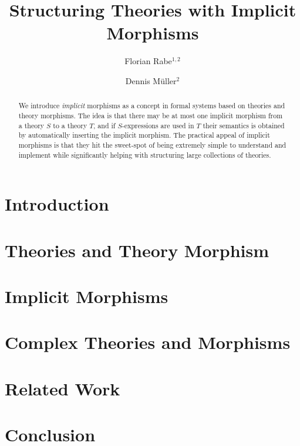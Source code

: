 \documentclass[orivec]{llncs}
\begin{document}
\title{Structuring Theories with Implicit Morphisms}
\author{Florian Rabe$^{1,2}$ \and Dennis M\"uller$^2$}
\maketitle

\begin{abstract}
We introduce \emph{implicit} morphisms as a concept in formal systems based on theories and theory morphisms.
The idea is that there may be at most one implicit morphism from a theory $S$ to a theory $T$, and if $S$-expressions are used in $T$ their semantics is obtained by automatically inserting the implicit morphism.
The practical appeal of implicit morphisms is that they hit the sweet-spot of being extremely simple to understand and implement while significantly helping with structuring large collections of theories.
\end{abstract}


\section{Introduction}


\section{Theories and Theory Morphism}


%

\section{Implicit Morphisms}


\section{Complex Theories and Morphisms}\label{sec:complex}


\section{Related Work}


\section{Conclusion}





\end{document}
